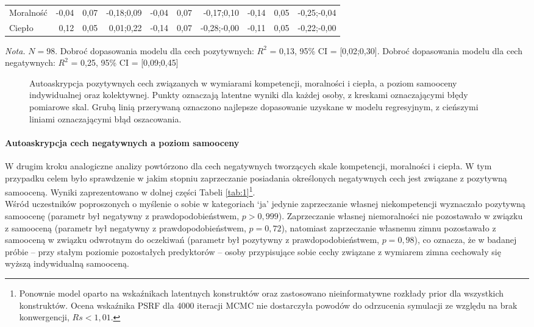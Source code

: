 \documentclass[man]{apa6}
\begin{document}
\begin{table*}[htbp]
\begin{threeparttable}
\begin{tabular}{lrrrrrrrrr}
 Moralność   & -0,04 & 0,07 & -0,18;0,09 & -0,04 & 0,07 & -0,17;0,10 & -0,14 & 0,05 & -0,25;-0,04 \\
 Ciepło      &  0,12 & 0,05 &  0,01;0,22 & -0,14 & 0,07 & -0,28;-0,00& -0,11 & 0,05 & -0,22;-0,00 \\
\bottomrule
\end{tabular}
\egroup
\begin{tablenotes}
{\small
\textit{Nota.} $N = 98$. Dobroć dopasowania modelu dla cech pozytywnych: $R^2$ = 0,13, 95\% CI = [0,02;0,30]. Dobroć dopasowania modelu dla cech negatywnych: $R^2$ = 0,25, 95\% CI = [0,09;0,45]
}
\end{tablenotes}
\end{threeparttable}
\end{table*}


\begin{figure*}[htbp]
   \centering
   \caption{Autoaskrypcja pozytywnych cech związanych w wymiarami kompetencji, moralności i ciepła, a poziom samooceny indywidualnej oraz kolektywnej. Punkty oznaczają latentne wyniki dla każdej osoby, z kreskami oznaczającymi błędy pomiarowe skal. Grubą linią przerywaną oznaczono najlepsze dopasowanie uzyskane w modelu regresyjnym, z cieńszymi liniami oznaczającymi błąd oszacowania.}
   \label{fig:1}
\end{figure*}

\paragraph{Autoaskrypcja cech negatywnych a poziom samooceny}
W drugim kroku analogiczne analizy powtórzono dla cech negatywnych tworzących skale kompetencji, moralności i ciepła. W tym przypadku celem było sprawdzenie w jakim stopniu zaprzeczanie posiadania określonych negatywnych cech jest związane z pozytywną samooceną. Wyniki zaprezentowano w dolnej części Tabeli \ref{tab:1}\footnote{Ponownie model oparto na wskaźnikach latentnych konstruktów oraz zastosowano nieinformatywne rozkłady prior dla wszystkich konstruktów. Ocena wskaźnika PSRF dla 4000 iteracji MCMC nie dostarczyła powodów do odrzucenia symulacji ze względu na brak konwergencji, $Rs < 1,01$.}. \\

Wśród uczestników poproszonych o myślenie o sobie w kategoriach `ja' jedynie zaprzeczanie własnej niekompetencji wyznaczało pozytywną samoocenę (parametr był negatywny z prawdopodobieństwem, $p > 0,999$). Zaprzeczanie własnej niemoralności nie pozostawało w związku z samooceną (parametr był negatywny z prawdopodobieństwem, $p = 0,72$), natomiast zaprzeczanie własnemu zimnu pozostawało z samooceną w związku odwrotnym do oczekiwań (parametr był pozytywny z prawdopodobieństwem, $p = 0,98$), co oznacza, że w badanej próbie -- przy stałym poziomie pozostałych predyktorów -- osoby przypisujące sobie cechy związane z wymiarem zimna cechowały się wyższą indywidualną samooceną.\\
\end{document}
